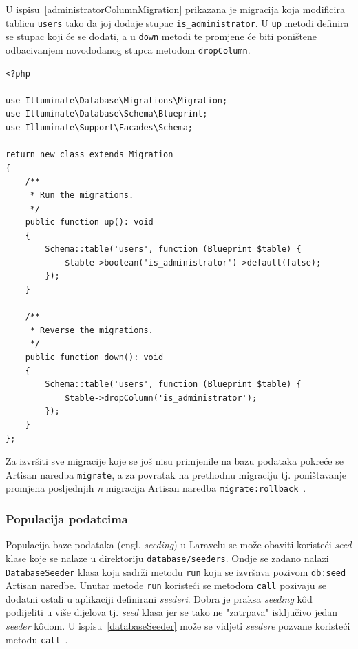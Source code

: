 U ispisu~\ref{administratorColumnMigration} prikazana je migracija koja modificira tablicu \texttt{users} tako da joj dodaje stupac \texttt{is\_administrator}. U \texttt{up} metodi definira se stupac koji će se dodati, a u \texttt{down} metodi te promjene će biti poništene odbacivanjem novododanog stupca metodom \texttt{dropColumn}.

\begin{lstlisting}[caption={Migracija za dodavanje stupca \texttt{is\_administrator} u tablicu \texttt{users}}, label=administratorColumnMigration]
<?php

use Illuminate\Database\Migrations\Migration;
use Illuminate\Database\Schema\Blueprint;
use Illuminate\Support\Facades\Schema;

return new class extends Migration
{
    /**
     * Run the migrations.
     */
    public function up(): void
    {
        Schema::table('users', function (Blueprint $table) {
            $table->boolean('is_administrator')->default(false);
        });
    }

    /**
     * Reverse the migrations.
     */
    public function down(): void
    {
        Schema::table('users', function (Blueprint $table) {
            $table->dropColumn('is_administrator');
        });
    }
};

\end{lstlisting}

Za izvršiti sve migracije koje se još nisu primjenile na bazu podataka pokreće se Artisan naredba \texttt{migrate}, a za povratak na prethodnu migraciju tj. poništavanje promjena posljednjih \textit{n} migracija Artisan naredba \texttt{migrate:rollback}~\cite{migrations}.

\subsubsection{Populacija podatcima}
Populacija baze podataka (engl. \textit{seeding}) u Laravelu se može obaviti koristeći \textit{seed} klase koje se nalaze u direktoriju \texttt{database/seeders}. Ondje se zadano nalazi \\ \texttt{DatabaseSeeder} klasa koja sadrži metodu \texttt{run} koja se izvršava pozivom \texttt{db:seed} Artisan naredbe. Unutar metode \texttt{run} koristeći se metodom \texttt{call} pozivaju se dodatni ostali u aplikaciji definirani \textit{seederi}. Dobra je praksa \textit{seeding} k\^od podijeliti u više dijelova tj. \textit{seed} klasa jer se tako ne "zatrpava" isključivo jedan \textit{seeder} k\^odom. U ispisu~\ref{databaseSeeder} može se vidjeti \textit{seedere} pozvane koristeći metodu \texttt{call}~\cite{seeding}.

